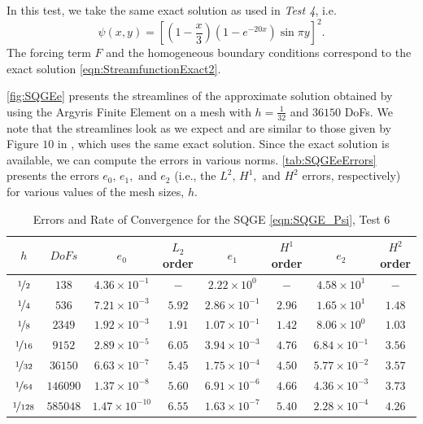 In this test, we take the same exact solution as used in \emph{Test 4}, i.e.
\begin{equation}
  \psi(x,y) = \left[\left(1 - \frac{x}{3}\right)\left(1-e^{-20x}\right) \sin \pi y\right]^2.
  \label{eqn:StreamfunctionExact2}
\end{equation}
The forcing term $F$ and the homogeneous boundary conditions correspond to the exact solution
\eqref{eqn:StreamfunctionExact2}.

\autoref{fig:SQGEe} presents the streamlines of the approximate solution
obtained by using the Argyris Finite Element on a mesh with $h=\frac{1}{32}$ and
$36150$ DoFs. We note that the streamlines look as we expect and are similar to
those given by Figure $10$ in \cite{Myers}, which uses the same exact solution.
Since the exact solution is available, we can compute the errors in various
norms. \autoref{tab:SQGEeErrors} presents the errors $e_0,\, e_1, \text{ and }
e_2$ (i.e., the $L^2,\, H^1, \text{ and } H^2$ errors, respectively) for various
values of the mesh sizes, $h$.

\begin{table}%
\begin{center}
\begin{tabular}{|c|c|c|c|c|c|c|c|}%
  \hline
  $h$ & $DoFs$ & $e_0$ & $L_2$ order & $e_1$ & $H^1$ order & $e_2$ & $H^2$ order \\[0.2em] %
  \hline
  $\nicefrac{1}{2}$ & $138$ & $4.36\times 10^{-1}$ & $-$ & $2.22\times 10^0$ & $-$ & $4.58\times 10^1$ & $-$\\
  $\nicefrac{1}{4}$ & $536$ & $7.21\times 10^{-3}$ & $5.92$ & $2.86\times 10^{-1}$ & $2.96$ & $1.65\times 10^1$ & $1.48$\\
  $\nicefrac{1}{8}$ & $2349$ & $1.92\times 10^{-3}$ & $1.91$ & $1.07\times 10^{-1}$ & $1.42$ & $8.06\times 10^{0}$ & $1.03$\\
  $\nicefrac{1}{16}$ & $9152$ & $2.89\times 10^{-5}$ & $6.05$ & $3.94\times 10^{-3}$ & $4.76$ & $6.84\times 10^{-1}$ & $3.56$\\
  $\nicefrac{1}{32}$ & $36150$ & $6.63\times 10^{-7}$ & $5.45$ & $1.75\times 10^{-4}$ & $4.50$ & $5.77\times 10^{-2}$ & $3.57$\\
  $\nicefrac{1}{64}$ & $146090$ & $1.37\times 10^{-8}$ & $5.60$ & $6.91\times 10^{-6}$ & $4.66$ & $4.36\times 10^{-3}$ & $3.73$\\
  $\nicefrac{1}{128}$ & $585048$ & $1.47\times 10^{-10}$ & $6.55$ & $1.63\times 10^{-7}$ & $5.40$ & $2.28\times 10^{-4}$ & $4.26$ \\
 \hline
\end{tabular}
\end{center}
\caption{Errors and Rate of Convergence for the SQGE \eqref{eqn:SQGE_Psi}, Test 6}
\label{tab:SQGEeErrors}
\end{table}

